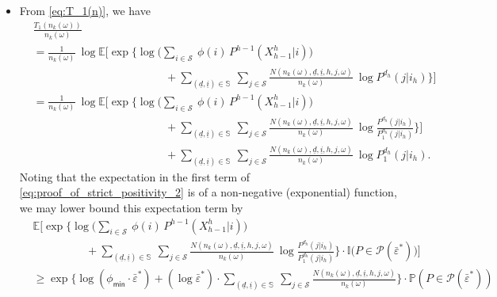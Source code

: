 \begin{itemize}
	\item {\color{black} From \eqref{eq:T_1(n)}, we have
	\begin{align}
		&\frac{T_1(n_k(\omega))}{n_k(\omega)}\nonumber\\
		&=\frac{1}{n_k(\omega)}~\log \mathbb{E}\bigg[\exp\bigg\lbrace\log\bigg(\sum\limits_{i\in \mathcal{S}}~\phi(i)\,P^{h-1}(X_{h-1}^h|i)\bigg)\nonumber\\
		&\hspace{5cm}+\sum\limits_{(\underline{d}, \underline{i})\in \mathbb{S}}~\sum\limits_{j\in \mathcal{S}}\frac{N(n_k(\omega), \underline{d}, \underline{i}, h, j, \omega)}{n_k(\omega)}~ \log P^{d_h}(j|i_h)\bigg\rbrace\bigg]\nonumber\\
		&=\frac{1}{n_k(\omega)}~\log \mathbb{E}\bigg[\exp\bigg\lbrace\log\bigg(\sum\limits_{i\in \mathcal{S}}~\phi(i)\,P^{h-1}(X_{h-1}^h|i)\bigg)\nonumber\\
		&\hspace{5cm}+\sum\limits_{(\underline{d}, \underline{i})\in \mathbb{S}}~\sum\limits_{j\in \mathcal{S}}\frac{N(n_k(\omega), \underline{d}, \underline{i}, h, j, \omega)}{n_k(\omega)}~ \log \frac{P^{d_h}(j|i_h)}{P_1^{d_h}(j|i_h)}\bigg\rbrace\bigg]\nonumber\\
		&\hspace{5cm}+\sum\limits_{(\underline{d}, \underline{i})\in \mathbb{S}}~\sum\limits_{j\in \mathcal{S}}\frac{N(n_k(\omega), \underline{d}, \underline{i}, h, j, \omega)}{n_k(\omega)}~ \log P_1^{d_h}(j|i_h).
		\label{eq:proof_of_strict_positivity_2}
\end{align}
Noting that the expectation in the first term of \eqref{eq:proof_of_strict_positivity_2} is of a non-negative (exponential) function, we may lower bound this expectation term by
\begin{align}
	&\mathbb{E}\bigg[\exp\bigg\lbrace\log \bigg(\sum\limits_{i\in \mathcal{S}}~\phi(i)\, P^{h-1}(X_{h-1}^{h}|i)\bigg) \nonumber\\
	&\hspace{2cm}+ \sum\limits_{(\underline{d}, \underline{i})\in \mathbb{S}}~\sum\limits_{j\in \mathcal{S}}\frac{N(n_k(\omega), \underline{d}, \underline{i}, h, j, \omega)}{n_k(\omega)}~ \log \frac{P^{d_{h }}(j|i_{h})}{P_1^{d_{h }}(j|i_{h})}\bigg\rbrace\cdot \mathbb{I}\bigg(P\in \mathscr{P}(\bar{\varepsilon}^*)\bigg)\bigg]\nonumber\\
	&\geq \exp\bigg\lbrace\log (\phi_{\textsf{min}}\cdot \bar{\varepsilon}^*)+(\log \bar{\varepsilon}^*)\cdot \sum\limits_{(\underline{d}, \underline{i})\in \mathbb{S}}~\sum\limits_{j\in \mathcal{S}}\frac{N(n_k(\omega), \underline{d}, \underline{i}, h, j, \omega)}{n_k(\omega)} \bigg\rbrace\cdot \mathbb{P}(P\in \mathscr{P}(\bar{\varepsilon}^*))\nonumber\\

\end{align}}
\end{itemize}
